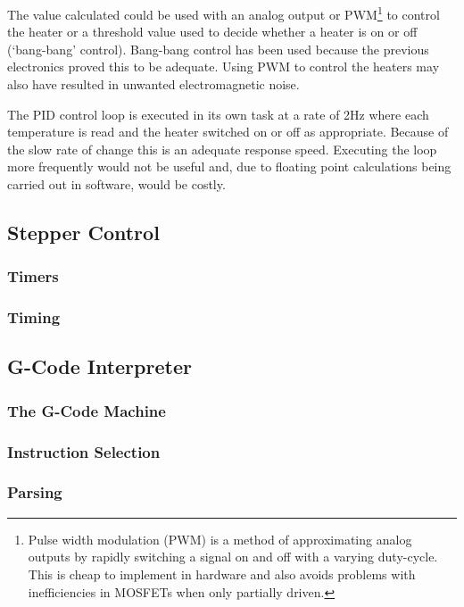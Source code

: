 				The value calculated could be used with an analog output or
				PWM\footnote{Pulse width modulation (PWM) is a method of approximating
				analog outputs by rapidly switching a signal on and off with a varying
				duty-cycle. This is cheap to implement in hardware and also avoids
				problems with inefficiencies in MOSFETs when only partially driven.} to
				control the heater or a threshold value used to decide whether a heater
				is on or off (`bang-bang' control). Bang-bang control has been used
				because the previous electronics proved this to be adequate. Using PWM
				to control the heaters may also have resulted in unwanted
				electromagnetic noise.
				
				The PID control loop is executed in its own task at a rate of 2Hz where
				each temperature is read and the heater switched on or off as
				appropriate. Because of the slow rate of change this is an adequate
				response speed. Executing the loop more frequently would not be useful
				and, due to floating point calculations being carried out in software,
				would be costly.
		
		\subsection{Stepper Control}
			
			\subsubsection{Timers}
			
			\subsubsection{Timing}
		
		\subsection{G-Code Interpreter}
			
			\subsubsection{The G-Code Machine}
			
			\subsubsection{Instruction Selection}
			
			\subsubsection{Parsing}
		

